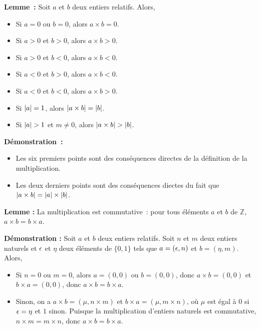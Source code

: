    \done 

\medskip

\noindent\textbf{Lemme :} Soit $a$ et $b$ deux entiers relatifs. 
    Alors, 
    \begin{itemize}[nosep]
        \item Si $a = 0$ ou $b = 0$, alors $a \times b = 0$.
        \item Si $a > 0$ et $b > 0$, alors $a \times b > 0$.
        \item Si $a > 0$ et $b < 0$, alors $a \times b < 0$.
        \item Si $a < 0$ et $b > 0$, alors $a \times b < 0$.
        \item Si $a < 0$ et $b < 0$, alors $a \times b > 0$.
        \item Si $\left\lvert a \right\rvert = 1$, alors $\left\lvert a \times b \right\rvert = \left\lvert b \right\rvert$.
        \item Si $\left\lvert a \right\rvert > 1$ et $m \neq 0$, alors $\left\lvert a \times b \right\rvert > \left\lvert b \right\rvert$.
    \end{itemize}

\medskip

\noindent\textbf{Démonstration :}

    \begin{itemize}[nosep]
        \item Les six premiers points sont des conséquences directes de la définition de la multiplication.
        \item Les deux derniers points sont des conséquences diectes du fait que $\left\lvert a \times b \right\rvert = \left\lvert a \right\rvert \times \left\lvert b \right\rvert$.
    \end{itemize}
    
    \done

\medskip

\noindent\textbf{Lemme :} La multiplication est commutative : pour tous éléments $a$ et $b$ de $\mathbb{Z}$, $a \times b = b \times a$.

\medskip

\noindent\textbf{Démonstration :} Soit $a$ et $b$ deux entiers relatifs. 
    Soit $n$ et $m$ deux entiers naturels et $\epsilon$ et $\eta$ deux éléments de $\lbrace 0, 1 \rbrace$ tels que $a = (\epsilon, n)$ et $b = (\eta, m)$. 
    Alors, 
    \begin{itemize}[nosep]
        \item Si $n = 0$ ou $m = 0$, alors $a=(0,0)$ ou $b=(0,0)$, donc $a \times b = (0,0)$ et $b \times a = (0,0)$, donc $a \times b = b \times a$. 
        \item Sinon, on a $a \times b = (\mu, n \times m)$ et $b \times a = (\mu, m \times n)$, où $\mu$ est égal à $0$ si $\epsilon = \eta$ et $1$ sinon.
            Puisque la multiplication d'entiers naturels est commutative, $n \times m = m \times n$, donc $a \times b = b \times a$.
    \end{itemize}

